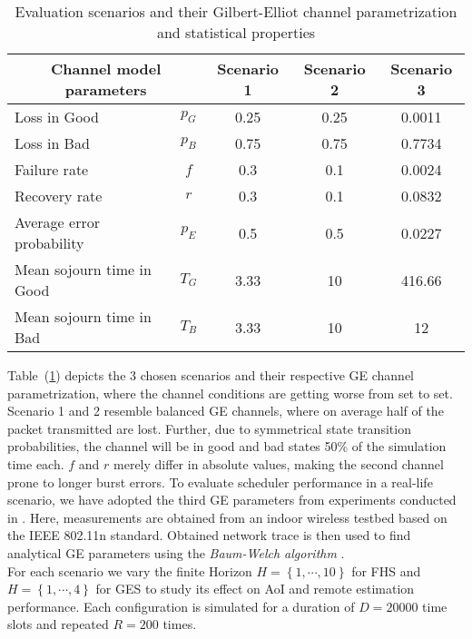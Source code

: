 \begin{table}[htb]
  \begin{center}
  \begin{tabular}{|lc|c|c|c|} 
  \hline
  \multicolumn{2}{|c|}{\textbf{Channel model parameters}} & \textbf{Scenario 1} & \textbf{Scenario 2} & \textbf{Scenario 3} \\
  \hline \hline
  Loss in Good & $p_G$ & 0.25 & 0.25 & 0.0011 \\ 
  Loss in Bad & $p_B$ & 0.75 & 0.75 &  0.7734 \\ 
  Failure rate & $f$ & 0.3 & 0.1 & 0.0024 \\ 
  Recovery rate & $r$ & 0.3 & 0.1 & 0.0832 \\
  \hline
  Average error probability & $p_E$ & 0.5 & 0.5 & 0.0227 \\
  Mean sojourn time in Good & $T_G$ & 3.33 & 10 & 416.66 \\
  Mean sojourn time in Bad & $T_B$ & 3.33 & 10 & 12 \\
  \hline
  \end{tabular}
  \end{center}
  \caption{Evaluation scenarios and their Gilbert-Elliot channel parametrization and statistical properties}
  \label{tab:scenarios}
\end{table}

Table~(\ref{tab:scenarios}) depicts the 3 chosen scenarios and their respective
GE channel parametrization, where the channel conditions are getting worse from
set to set. Scenario 1 and 2 resemble balanced GE channels, where on average
half of the packet transmitted are lost. Further, due to symmetrical state
transition probabilities, the channel will be in good and bad states 50\% of the
simulation time each. $f$ and $r$ merely differ in absolute values, making the
second channel prone to longer burst errors. To evaluate scheduler performance
in a real-life scenario, we have adopted the third GE parameters from
experiments conducted in \cite{frohn2011analyzing}. Here, measurements are
obtained from an indoor wireless testbed based on the IEEE 802.11n standard.
Obtained network trace is then used to find analytical GE parameters using the
\textit{Baum-Welch algorithm} \cite{baum1970maximization}. \\ 
For each scenario we vary the finite Horizon $H=\left\{ 1, \cdots, 10\right\}$
for FHS and $H=\left\{ 1, \cdots, 4\right\}$ for GES to study its effect on AoI
and remote estimation performance. Each configuration is simulated for a
duration of $D=20000$ time slots and repeated $R=200$ times.

